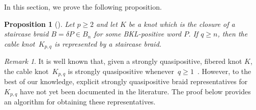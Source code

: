 \documentclass{amsart}
\theoremstyle{definition}
\theoremstyle{remark}
\newtheorem{remark}[definition]{Remark}%
\theoremstyle{plain}
\newtheorem{proposition}[definition]{Proposition}
\begin{document}
In this section, we prove the following proposition.

\begin{proposition}[{}]\label{prop:staircase_cabling}
Let $p \geq 2$ and let $K$ be a knot which is the closure of a staircase braid $B = \delta P\in B_n$ for some BKL-positive word $P$. If $q \geq n$, then the cable knot~$K_{p,q}$ is represented by a staircase braid.
\end{proposition}

\begin{remark}
    It is well known that, given a strongly quasipositive, fibered knot $K$, the cable knot~$K_{p,q}$ is strongly quasipositive whenever~$q \geq 1$~\cite{hedden:cabling}. However, to the best of our knowledge, explicit strongly quasipositive braid representatives for~$K_{p,q}$ have not yet been documented in the literature. The proof below provides an algorithm for obtaining these representatives.
\end{remark}
\end{document}
